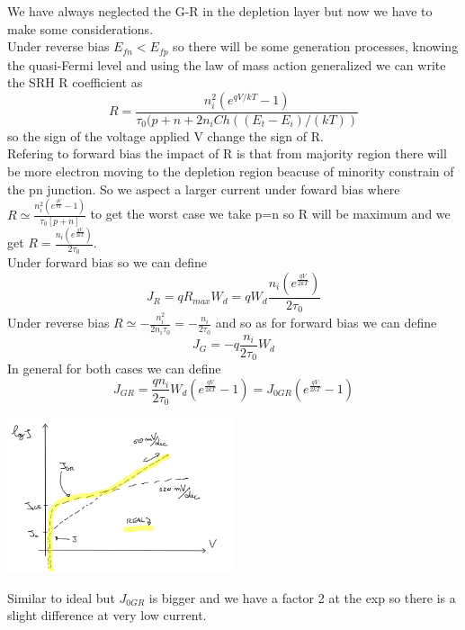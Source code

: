 We have always neglected the G-R in the depletion layer but now we have to make some considerations.\\
Under reverse bias $E_{fn}<E_{fp}$ so there will be some generation processes, knowing the quasi-Fermi level and using the law of mass action generalized we can write the SRH R coefficient as
\begin{equation}
R=\frac{n_i^2(e^{qV/kT}-1)}{\tau_0(p+n+2n_i Ch((E_t-E_i)/(kT))}
\end{equation} 
so the sign of the voltage applied V change the sign of R.\\
Refering to forward bias the impact of R is that from majority region there will be more electron moving to the depletion region beacuse of minority constrain of the pn junction. 
So we aspect a larger current under foward bias where $R\simeq \frac{n_i^2(e^{\frac{qV}{kT}}-1)}{\tau_0[p+n]}$ to get the worst case we take p=n so R will be maximum and we get $R= \frac{n_i(e^{\frac{qV}{2kT}})}{2\tau_0}$.\\
Under forward bias so we can define 
\begin{equation}
J_R=qR_{max}W_d=qW_d\frac{n_i(e^{\frac{qV}{2kT}})}{2\tau_0}
\end{equation}
Under reverse bias $R\simeq -\frac{n_i^2}{2n_i\tau_0}=-\frac{n_i}{2\tau_0}$ and so as for forward bias we can define
\begin{equation}
J_G=-q\frac{n_i}{2\tau_0}W_d
\end{equation}
In general for both cases we can define 
\begin{equation}
J_{GR}=\frac{qn_i}{2\tau_0}W_d(e^{\frac{qV}{2kT}}-1)=J_{0GR}(e^{\frac{qV}{2kT}}-1)
\end{equation}

\centering
\includegraphics[width=0.5\textwidth]{lowcurrent.png}\\
\raggedright

Similar to ideal but $J_{0GR}$ is bigger and we have a factor 2 at the exp so there is a slight difference at very low current.

\centering
{}
\raggedright

